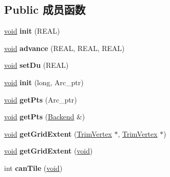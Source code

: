 \subsection*{Public 成员函数}
\begin{DoxyCompactItemize}
\item 
\mbox{\label{class_trim_region_a8b1d7dadec2a18645f09f07fba996fe8}} 
\hyperlink{interfacevoid}{void} {\bfseries init} (R\+E\+AL)
\item 
\mbox{\label{class_trim_region_a8b8ed49d0f61f4ad8e0c379b56d0860a}} 
\hyperlink{interfacevoid}{void} {\bfseries advance} (R\+E\+AL, R\+E\+AL, R\+E\+AL)
\item 
\mbox{\label{class_trim_region_ae75fc47b20df0e7f7e4103666f51529e}} 
\hyperlink{interfacevoid}{void} {\bfseries set\+Du} (R\+E\+AL)
\item 
\mbox{\label{class_trim_region_add26e5bf89e989123e3bdbc79498437c}} 
\hyperlink{interfacevoid}{void} {\bfseries init} (long, Arc\+\_\+ptr)
\item 
\mbox{\label{class_trim_region_afb9f136ea737f6e760ad9f98e8ba194c}} 
\hyperlink{interfacevoid}{void} {\bfseries get\+Pts} (Arc\+\_\+ptr)
\item 
\mbox{\label{class_trim_region_aac4bedccd57fe0c62a8a556cea2ed51e}} 
\hyperlink{interfacevoid}{void} {\bfseries get\+Pts} (\hyperlink{class_backend}{Backend} \&)
\item 
\mbox{\label{class_trim_region_aeb70b6b146e47629751e656ea4073224}} 
\hyperlink{interfacevoid}{void} {\bfseries get\+Grid\+Extent} (\hyperlink{class_trim_vertex}{Trim\+Vertex} $\ast$, \hyperlink{class_trim_vertex}{Trim\+Vertex} $\ast$)
\item 
\mbox{\label{class_trim_region_a1bae2797064a18e5ae167267ef34409c}} 
\hyperlink{interfacevoid}{void} {\bfseries get\+Grid\+Extent} (\hyperlink{interfacevoid}{void})
\item 
\mbox{\label{class_trim_region_a16e1d31a7f09a089b23ff2eabcde7128}} 
int {\bfseries can\+Tile} (\hyperlink{interfacevoid}{void})
\end{DoxyCompactItemize}
